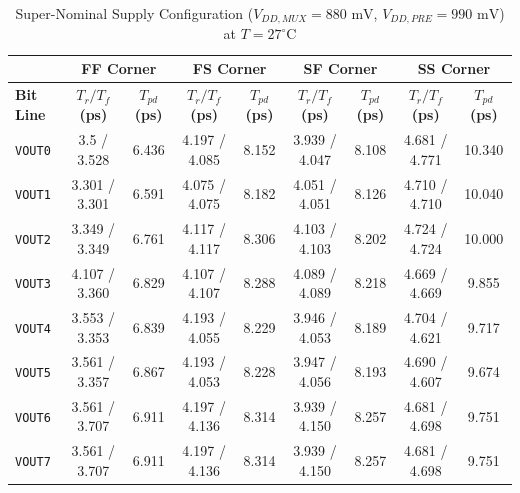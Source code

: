 \begin{table}[H]
    \centering
    \renewcommand{\arraystretch}{1.3}
    \setlength{\tabcolsep}{4pt}
    \small
    \begin{tabular}{|l|cc|cc|cc|cc|}
        \hline
        & \multicolumn{2}{c|}{\textbf{FF Corner}} & \multicolumn{2}{c|}{\textbf{FS Corner}} & \multicolumn{2}{c|}{\textbf{SF Corner}} & \multicolumn{2}{c|}{\textbf{SS Corner}} \\ \hline
        \textbf{Bit Line} & \textbf{$T_r / T_f$ (ps)} & \textbf{$T_{pd}$ (ps)} & \textbf{$T_r / T_f$ (ps)} & \textbf{$T_{pd}$ (ps)} & \textbf{$T_r / T_f$ (ps)} & \textbf{$T_{pd}$ (ps)} & \textbf{$T_r / T_f$ (ps)} & \textbf{$T_{pd}$ (ps)} \\ \hline
        \texttt{VOUT0} & 3.5 / 3.528 & 6.436 & 4.197 / 4.085 & 8.152 & 3.939 / 4.047 & 8.108 & 4.681 / 4.771 & 10.340 \\ 
        \texttt{VOUT1} & 3.301 / 3.301 & 6.591 & 4.075 / 4.075 & 8.182 & 4.051 / 4.051 & 8.126 & 4.710 / 4.710 & 10.040 \\ 
        \texttt{VOUT2} & 3.349 / 3.349 & 6.761 & 4.117 / 4.117 & 8.306 & 4.103 / 4.103 & 8.202 & 4.724 / 4.724 & 10.000 \\ 
        \texttt{VOUT3} & 4.107 / 3.360 & 6.829 & 4.107 / 4.107 & 8.288 & 4.089 / 4.089 & 8.218 & 4.669 / 4.669 & 9.855 \\ 
        \texttt{VOUT4} & 3.553 / 3.353 & 6.839 & 4.193 / 4.055 & 8.229 & 3.946 / 4.053 & 8.189 & 4.704 / 4.621 & 9.717 \\ 
        \texttt{VOUT5} & 3.561 / 3.357 & 6.867 & 4.193 / 4.053 & 8.228 & 3.947 / 4.056 & 8.193 & 4.690 / 4.607 & 9.674 \\ 
        \texttt{VOUT6} & 3.561 / 3.707 & 6.911 & 4.197 / 4.136 & 8.314 & 3.939 / 4.150 & 8.257 & 4.681 / 4.698 & 9.751 \\ 
        \texttt{VOUT7} & 3.561 / 3.707 & 6.911 & 4.197 / 4.136 & 8.314 & 3.939 / 4.150 & 8.257 & 4.681 / 4.698 & 9.751 \\ \hline
    \end{tabular}
    \vspace{2mm}
    \caption{Super-Nominal Supply Configuration ($V_{DD,MUX} = 880\text{ mV}$, $V_{DD,PRE} = 990\text{ mV}$) at $T = 27^{\circ}\text{C}$}
    \label{tab:supernominal_sym_27}
\end{table}

